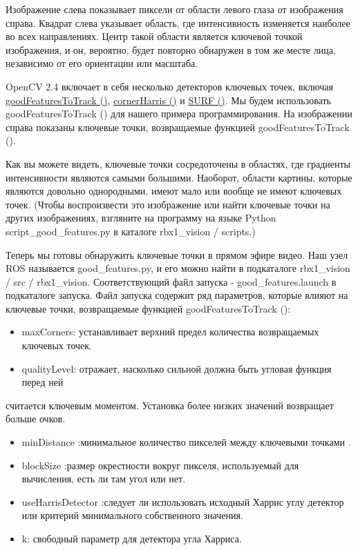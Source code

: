 Изображение слева показывает пиксели от области левого глаза от изображения справа. Квадрат слева указывает область, где интенсивность изменяется наиболее во всех направлениях. Центр такой области является ключевой точкой изображения, и он, вероятно, будет повторно обнаружен в том же месте лица, независимо от его ориентации или масштаба.

OpenCV 2.4 включает в себя несколько детекторов ключевых точек, включая \href{http://docs.opencv.org/modules/imgproc/doc/feature_detection.html?highlight=goodfeaturestotrack%23cv2.goodFeaturesToTrack}{goodFeaturesToTrack ()}, \href{http://docs.opencv.org/modules/imgproc/doc/feature_detection.html?highlight=cornerharris%23cv2.cornerHarris}{cornerHarris ()} и \href{http://docs.opencv.org/modules/nonfree/doc/feature_detection.html?highlight=surf%23cv2.SURF}{SURF ()}. Мы будем использовать goodFeaturesToTrack () для нашего примера программирования. На изображении справа показаны ключевые точки, возвращаемые функцией goodFeaturesToTrack ().

Как вы можете видеть, ключевые точки сосредоточены в областях, где градиенты интенсивности являются самыми большими. Наоборот, области картины, которые являются довольно однородными, имеют мало или вообще не имеют ключевых точек. (Чтобы воспроизвести это изображение или найти ключевые точки на других изображениях, взгляните на программу на языке Python script\_good\_features.py в каталоге rbx1\_vision / scripts.)

Теперь мы готовы обнаружить ключевые точки в прямом эфире видео. Наш узел ROS называется good\_features.py, и его можно найти в подкаталоге rbx1\_vision / src / rbx1\_vision. Соответствующий файл запуска - good\_features.launch в подкаталоге запуска. Файл запуска содержит ряд параметров, которые влияют на ключевые точки, возвращаемые функцией goodFeaturesToTrack ():

\begin{itemize} 
\item { maxCorners: устанавливает верхний предел количества возвращаемых ключевых точек.} 
\item { qualityLevel: отражает, насколько сильной должна быть угловая функция перед ней} 
\end{itemize} 

  считается ключевым моментом. Установка более низких значений возвращает больше очков.

\begin{itemize} 
\item { minDistance :минимальное количество пикселей между ключевыми точками .} 
\item {  blockSize :размер окрестности вокруг пикселя, используемый для вычисления, есть ли там угол или нет.} 
\item { useHarrisDetector :следует ли использовать  исходный Харрис углу детектор или критерий минимального собственного значения.} 
\item { k: свободный параметр для детектора угла Харриса.} 
\end{itemize} 

